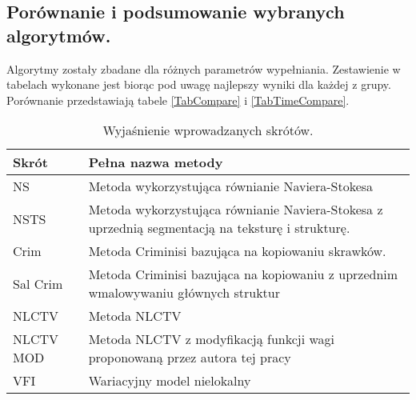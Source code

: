 \documentclass[12pt, twoside, openany]{report}
\theoremstyle{definition}
\begin{document}
\subsection{Porównanie i podsumowanie wybranych algorytmów.}
Algorytmy zostały zbadane dla różnych parametrów wypełniania. Zestawienie w tabelach wykonane jest biorąc pod uwagę najlepszy wyniki dla każdej z grupy. Porównanie przedstawiają tabele \ref{TabCompare} i \ref{TabTimeCompare}.
\newpage
\begin{table}[!h]
    \centering
    \begin{tabular}{|p{4cm}|p{9cm}|}
        \hline
         Skrót & Pełna nazwa metody \\ \hline \hline
         NS    & Metoda wykorzystująca równianie Naviera-Stokesa \\ \hline
         NSTS    & Metoda wykorzystująca równianie Naviera-Stokesa z uprzednią segmentacją na teksturę i strukturę. \\ \hline
         Crim    & Metoda Criminisi bazująca na kopiowaniu skrawków. \\ \hline
         Sal Crim    & Metoda Criminisi bazująca na kopiowaniu z uprzednim wmalowywaniu głównych
         struktur \\ \hline
         NLCTV    & Metoda NLCTV \\ \hline
         NLCTV MOD   & Metoda NLCTV z modyfikacją funkcji wagi proponowaną przez autora tej pracy \\ \hline
         VFI   & Wariacyjny model nielokalny \\ \hline
    \end{tabular}
    \caption{Wyjaśnienie wprowadzanych skrótów.}
\end{table}
\end{document}

